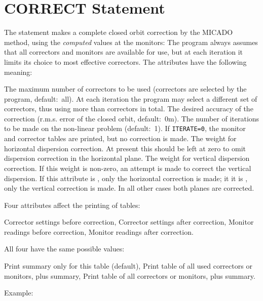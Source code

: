 \section{CORRECT Statement}
\label{S-CORRECT}
The  statement makes a complete closed orbit correction
by the MICADO method, using the {\em computed} values at the monitors:
The program always assumes that all correctors and monitors
are available for use,
but at each iteration it limits its choice to  most
effective correctors.
The attributes have the following meaning:
\begin{mylist}
The maximum number of correctors to be used
(correctors are selected by the program, default:~all).
At each iteration the program may select a different set
of  correctors, thus using more than  correctors
in total.
The desired accuracy of the correction
(r.m.s. error of the closed orbit, default:~0{\rm m}).
The number of iterations to be made on the non-linear problem
(default:~1).
If {\tt ITERATE=0}, the monitor and corrector tables are printed,
but no correction is made.
The weight for horizontal dispersion correction.
At present this should be left at zero to omit dispersion correction
in the horizontal plane.
The weight for vertical dispersion correction.
If this weight is non-zero,
an attempt is made to correct the vertical dispersion.
If this attribute is , only the horizontal correction is made;
it it is , only the vertical correction is made.
In all other cases both planes are corrected.
\end{mylist}
Four attributes affect the printing of tables:
\begin{mylist}
Corrector settings before correction,
Corrector settings after correction,
Monitor readings before correction,
Monitor readings after correction.
\end{mylist}
All four have the same possible values:
\begin{mylist}
Print summary only for this table (default),
Print table of all used correctors or monitors,
plus summary,
Print table of all correctors or monitors, plus summary.
\end{mylist}
Example:
 
